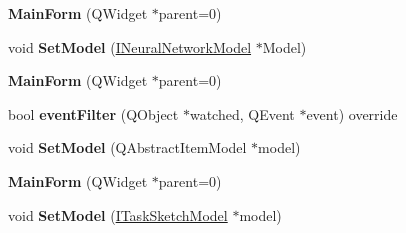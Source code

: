\begin{DoxyCompactItemize}
\item 
{\bfseries Main\+Form} (Q\+Widget $\ast$parent=0)\hypertarget{class_main_form_a8407ed1ab0a7b7bef115711157c8f344}{}\label{class_main_form_a8407ed1ab0a7b7bef115711157c8f344}

\item 
void {\bfseries Set\+Model} (\hyperlink{class_i_neural_network_model}{I\+Neural\+Network\+Model} $\ast$Model)\hypertarget{class_main_form_a69da72ae01b90a41559c050e81020135}{}\label{class_main_form_a69da72ae01b90a41559c050e81020135}

\item 
{\bfseries Main\+Form} (Q\+Widget $\ast$parent=0)\hypertarget{class_main_form_a8407ed1ab0a7b7bef115711157c8f344}{}\label{class_main_form_a8407ed1ab0a7b7bef115711157c8f344}

\item 
bool {\bfseries event\+Filter} (Q\+Object $\ast$watched, Q\+Event $\ast$event) override\hypertarget{class_main_form_a1ca32d59dddffa2396c8175e4dbcff58}{}\label{class_main_form_a1ca32d59dddffa2396c8175e4dbcff58}

\item 
void {\bfseries Set\+Model} (Q\+Abstract\+Item\+Model $\ast$model)\hypertarget{class_main_form_aa6a63e62eb08de727aba05a0a20c3d3e}{}\label{class_main_form_aa6a63e62eb08de727aba05a0a20c3d3e}

\item 
{\bfseries Main\+Form} (Q\+Widget $\ast$parent=0)\hypertarget{class_main_form_a8407ed1ab0a7b7bef115711157c8f344}{}\label{class_main_form_a8407ed1ab0a7b7bef115711157c8f344}

\item 
void {\bfseries Set\+Model} (\hyperlink{class_i_task_sketch_model}{I\+Task\+Sketch\+Model} $\ast$model)\hypertarget{class_main_form_a4d6783977b0be48e1523fd03d836e64b}{}\label{class_main_form_a4d6783977b0be48e1523fd03d836e64b}

\end{DoxyCompactItemize}

